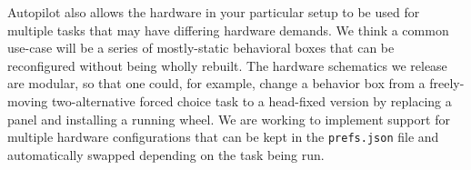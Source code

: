 Autopilot also allows the hardware in your particular setup to be used for multiple tasks that may have differing hardware demands. We think a common use-case will be a series of mostly-static behavioral boxes that can be reconfigured without being wholly rebuilt. The hardware schematics we release are modular, so that one could, for example, change a behavior box from a freely-moving two-alternative forced choice task to a head-fixed version by replacing a panel and installing a running wheel. We are working to implement support for multiple hardware configurations that can be kept in the \texttt{prefs.json} file and automatically swapped depending on the task being run.